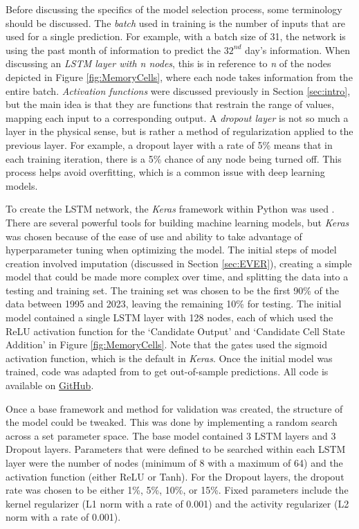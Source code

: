 Before discussing the specifics of the model selection process, some terminology should be discussed. The \textit{batch} used in training is the number of inputs that are used for a single prediction. For example, with a batch size of 31, the network is using the past month of information to predict the $32^{nd}$ day's information. When discussing an \textit{LSTM layer with n nodes}, this is in reference to \textit{n} of the nodes depicted in Figure \ref{fig:MemoryCells}, where each node takes information from the entire batch. \textit{Activation functions} were discussed previously in Section \ref{sec:intro}, but the main idea is that they are functions that restrain the range of values, mapping each input to a corresponding output. A \textit{dropout layer} is not so much a layer in the physical sense, but is rather a method of regularization applied to the previous layer. For example, a dropout layer with a rate of 5\% means that in each training iteration, there is a 5\% chance of any node being turned off. This process helps avoid over\-fitting, which is a common issue with deep learning models.

To create the LSTM network, the \textit{Keras} framework within Python was used \citep{chollet2015keras}. There are several powerful tools for building machine learning models, but \textit{Keras} was chosen because of the ease of use and ability to take advantage of hyperparameter tuning when optimizing the model. The initial steps of model creation involved imputation (discussed in Section \ref{sec:EVER}), creating a simple model that could be made more complex over time, and splitting the data into a testing and training set. The training set was chosen to be the first 90\% of the data between 1995 and 2023, leaving the remaining 10\% for testing. The initial model contained a single LSTM layer with 128 nodes, each of which used the ReLU activation function for the `Candidate Output' and `Candidate Cell State Addition' in Figure \ref{fig:MemoryCells}. Note that the gates used the sigmoid activation function, which is the default in \textit{Keras}. Once the initial model was trained, code was adapted from \cite{lstmkeras} to get out-of-sample predictions. All code is available on \href{https://github.com/lliucci/Writing-Project}{GitHub}.

Once a base framework and method for validation was created, the structure of the model could be tweaked. This was done by implementing a random search across a set parameter space. The base model contained 3 LSTM layers and 3 Dropout layers. Parameters that were defined to be searched within each LSTM layer were the number of nodes (minimum of 8 with a maximum of 64) and the activation function (either ReLU or Tanh). For the Dropout layers, the dropout rate was chosen to be either 1\%, 5\%, 10\%, or 15\%. Fixed parameters include the kernel regularizer (L1 norm with a rate of 0.001) and the activity regularizer (L2 norm with a rate of 0.001).

